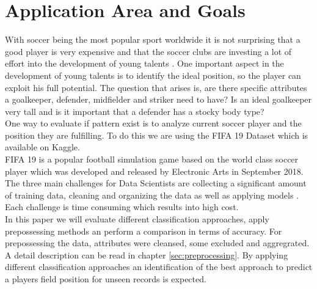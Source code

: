 \documentclass[runningheads]{llncs}
\begin{document}
\section{Application Area and Goals}
\label{intro}
With soccer being the most popular sport worldwide it is not surprising that a good player is very expensive and that the soccer clubs are investing a lot of effort into the development of young talents \cite{ref_Transfermarkt}. One important aspect in the development of young talents is to identify the ideal position, so the player can exploit his full potential.
The question that arises is, are there specific attributes a goalkeeper, defender, midfielder and striker need to have? Is an ideal goalkeeper very tall and is it important that a defender has a stocky body type?\\
One way to evaluate if pattern exist is to analyze current soccer player and the position they are fulfilling. To do this we are using the FIFA 19 Dataset which is available on Kaggle.\\
FIFA 19 is a popular football simulation game based on the world class soccer player which was developed and released by Electronic Arts in September 2018. \\
The three main challenges for Data Scientists are collecting a significant amount of training data, cleaning and organizing the data as well as applying models  \cite{ref_Crowdflower}. Each challenge is time consuming which results into high cost.\\
In this paper we will evaluate different classification approaches, apply prepossessing methods an perform a comparison in terms of accuracy. For prepossessing the data, attributes were cleansed, some excluded and aggregrated. A detail description can be read in chapter \ref{sec:preprocessing}.
By applying different classification approaches an identification of the best approach to predict a players field position for unseen records is expected.
\end{document}
